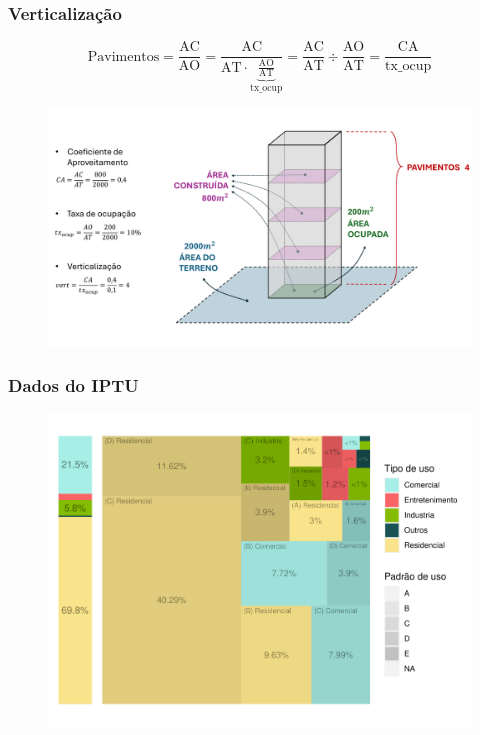 \documentclass[%
    9pt, 
    aspectratio=169,
]{beamer}
\begin{document}
\begin{frame}
    \frametitle{Verticalização}
    \begin{equation*}
        \text{Pavimentos}=\frac{\text{AC}}{\text{AO}}=\frac{\text{AC}}{\text{AT}\cdot\underbrace{\frac{\text{AO}}{\text{AT}}}_\text{tx\_ocup}}=\frac{\text{AC}}{\text{AT}}\div\frac{\text{AO}}{\text{AT}}=\frac{\text{CA}}{\text{tx\_ocup}}
    \end{equation*}
    \begin{figure}
        \centering
        \includegraphics[height = .6\textheight]{imagens/desenho.pdf}
    \end{figure}
\end{frame}

\begin{frame}
    \frametitle{Dados do IPTU}
    \begin{figure}
        \centering
        \includegraphics[height = .95\textheight]{imagens/tree_area_construida.pdf}
    \end{figure}
\end{frame}
\end{document}
